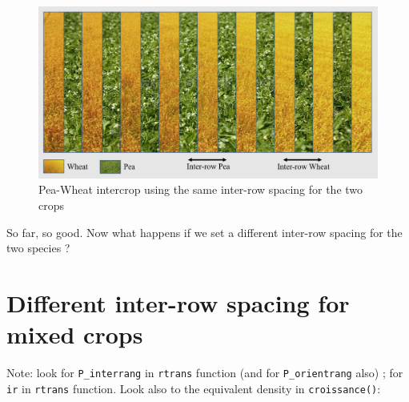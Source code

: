 \documentclass[]{book}
\theoremstyle{definition}
\theoremstyle{definition}
\theoremstyle{definition}
\theoremstyle{remark}
\begin{document}
\begin{figure}
\centering
\includegraphics{img/Same-Interrow.png}
\caption{Pea-Wheat intercrop using the same inter-row spacing for the
two crops}
\end{figure}

So far, so good. Now what happens if we set a different inter-row
spacing for the two species ?

\section{Different inter-row spacing for mixed
crops}\label{different-inter-row-spacing-for-mixed-crops}

Note: look for \texttt{P\_interrang} in \texttt{rtrans} function (and
for \texttt{P\_orientrang} also) ; for \texttt{ir} in \texttt{rtrans}
function. Look also to the equivalent density in \texttt{croissance()}:


\end{document}
